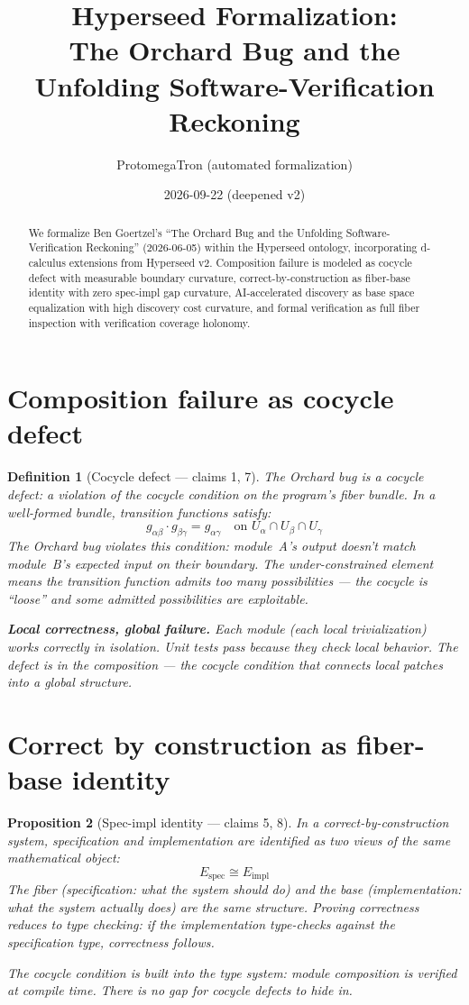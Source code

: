 \documentclass[11pt,a4paper]{article}
\title{Hyperseed Formalization:\\
  The Orchard Bug and the Unfolding Software-Verification Reckoning}
\author{ProtomegaTron (automated formalization)}
\date{2026-09-22 (deepened v2)}
\newtheorem{definition}{Definition}[section]
\newtheorem{proposition}[definition]{Proposition}
\begin{document}
\maketitle

\begin{abstract}
We formalize Ben Goertzel's ``The Orchard Bug and the Unfolding
Software-Verification Reckoning'' (2026-06-05) within the Hyperseed
ontology, incorporating d-calculus extensions from Hyperseed v2.
Composition failure is modeled as cocycle defect with measurable
boundary curvature, correct-by-construction as fiber-base identity
with zero spec-impl gap curvature, AI-accelerated discovery as
base space equalization with high discovery cost curvature, and
formal verification as full fiber inspection with verification
coverage holonomy.
\end{abstract}

\tableofcontents

\section{Composition failure as cocycle defect}

\begin{definition}[Cocycle defect --- claims 1, 7]
The Orchard bug is a cocycle defect: a violation of the cocycle
condition on the program's fiber bundle. In a well-formed bundle,
transition functions satisfy:
\[
  g_{\alpha\beta} \cdot g_{\beta\gamma} = g_{\alpha\gamma}
  \quad \text{on } U_\alpha \cap U_\beta \cap U_\gamma
\]
The Orchard bug violates this condition: module~A's output doesn't
match module~B's expected input on their boundary. The under-constrained
element means the transition function admits too many possibilities ---
the cocycle is ``loose'' and some admitted possibilities are exploitable.

\textbf{Local correctness, global failure.} Each module (each local
trivialization) works correctly in isolation. Unit tests pass because
they check local behavior. The defect is in the composition --- the
cocycle condition that connects local patches into a global structure.
\end{definition}

\section{Correct by construction as fiber-base identity}

\begin{proposition}[Spec-impl identity --- claims 5, 8]
\label{prop:correct}
In a correct-by-construction system, specification and implementation
are identified as two views of the same mathematical object:
\[
  E_{\text{spec}} \cong E_{\text{impl}}
\]
The fiber (specification: what the system should do) and the base
(implementation: what the system actually does) are the same structure.
Proving correctness reduces to type checking: if the implementation
type-checks against the specification type, correctness follows.

The cocycle condition is built into the type system: module composition
is verified at compile time. There is no gap for cocycle defects to
hide in.
\end{proposition}
\end{document}
